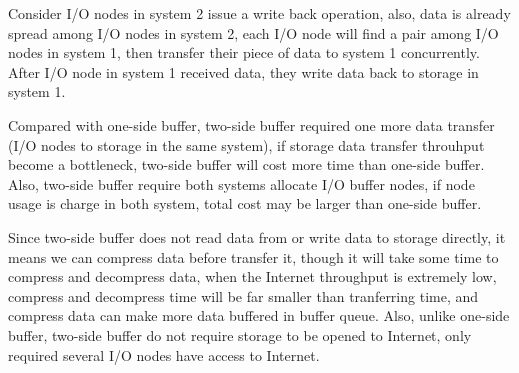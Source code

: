 Consider I/O nodes in system 2 issue a write back operation, also, data is already spread among I/O nodes in system 2, each I/O node will find a pair among I/O nodes in system 1, then transfer their piece of data to system 1 concurrently.
After I/O node in system 1 received data, they write data back to storage in system 1.

Compared with one-side buffer, two-side buffer required one more data transfer (I/O nodes to storage in the same system), if storage data transfer throuhput become a bottleneck, two-side buffer will cost more time than one-side buffer.
Also, two-side buffer require both systems allocate I/O buffer nodes, if node usage is charge in both system, total cost may be larger than one-side buffer.

Since two-side buffer does not read data from or write data to storage directly, it means we can compress data before transfer it, though it will take some time to compress and decompress data, when the Internet throughput is extremely low, compress and decompress time will be far smaller than tranferring time, and compress data can make more data buffered in buffer queue.
Also, unlike one-side buffer, two-side buffer do not require storage to be opened to Internet, only required several I/O nodes have access to Internet.




